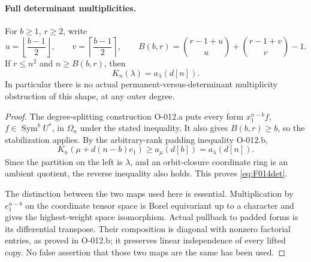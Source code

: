 \paragraph{Full determinant multiplicities.}
For \(b\geq1\), \(r\geq2\), write
\[
 u=\left\lfloor\frac{b-1}{2}\right\rfloor,\qquad
 v=\left\lceil\frac{b-1}{2}\right\rceil,\qquad
 B(b,r)=\binom{r-1+u}{u}+\binom{r-1+v}{v}-1.
\]
If \(r\leq n^2\) and \(n\geq B(b,r)\), then
\begin{equation}\label{eq:F014det}
                         K_n(\lambda)=a_\lambda(d[n]).
\end{equation}
In particular there is no actual permanent-versus-determinant
multiplicity obstruction of this shape, at any outer degree.

\begin{proof}
The degree-splitting construction O-012.a puts every form
\(x_1^{n-b}f\), \(f\in\operatorname{Sym}^b U^*\), in
\(\Omega_n\) under the stated inequality.
It also gives \(B(b,r)\geq b\), so the stabilization applies.
By the arbitrary-rank padding inequality O-012.b,
\[
 K_n(\mu+d(n-b)e_1)\geq a_\mu(d[b])=a_\lambda(d[n]).
\]
Since the partition on the left is \(\lambda\), and an orbit-closure
coordinate ring is an ambient quotient, the reverse inequality
also holds. This proves \eqref{eq:F014det}.

The distinction between the two maps used here is essential.
Multiplication by \(e_1^{n-b}\) on the coordinate tensor space
is Borel equivariant up to a character and gives the highest-weight
space isomorphism. Actual pullback to padded forms is its
differential transpose. Their composition is diagonal with
nonzero factorial entries, as proved in O-012.b; it preserves
linear independence of every lifted copy. No false assertion
that those two maps are the same has been used.
\end{proof}

